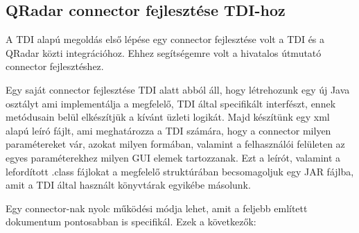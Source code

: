 \subsection{QRadar connector fejlesztése TDI-hoz}\label{subsec:connimpl}

A TDI alapú megoldás első lépése egy connector fejlesztése volt a TDI és a QRadar közti integrációhoz. Ehhez segítségemre volt a hivatalos útmutató connector fejlesztéshez. \cite{conndev} 

Egy saját connector fejlesztése TDI alatt abból áll, hogy létrehozunk egy új Java osztályt ami implementálja a megfelelő, TDI által specifikált interfészt, ennek metódusain belül elkészítjük a kívánt üzleti logikát. Majd készítünk egy xml alapú leíró fájlt, ami meghatározza a TDI számára, hogy a connector milyen paramétereket vár, azokat milyen formában, valamint a felhasználói felületen az egyes paraméterekhez milyen GUI elemek tartozzanak. Ezt a leírót, valamint a lefordított .class fájlokat a megfelelő struktúrában becsomagoljuk egy JAR fájlba, amit a TDI által használt könyvtárak egyikébe másolunk. 

Egy connector-nak nyolc működési módja lehet, amit a feljebb említett dokumentum pontosabban is specifikál. Ezek a következők:


